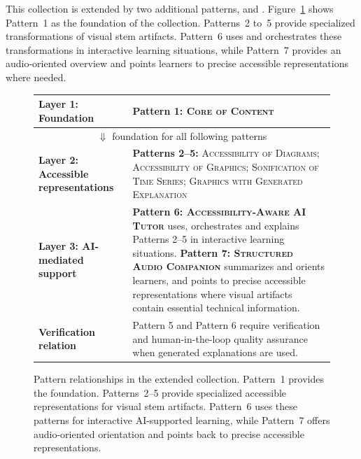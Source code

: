This collection is extended by two additional patterns, \patternSixInline and \patternSevenInline. Figure~\ref{fig:pattern-relationships} shows Pattern~1 as the foundation of the collection. Patterns~2 to~5 provide specialized transformations of visual \ac{stem} artifacts. Pattern~6 uses and orchestrates these transformations in interactive learning situations, while Pattern~7 provides an audio-oriented overview and points learners to precise accessible representations where needed.

\begin{figure}[ht]
\centering
\small
\setlength{\tabcolsep}{4pt}
\renewcommand{\arraystretch}{1.25}
\begin{tabularx}{\textwidth}{|p{}|X|}
\hline
\textbf{Layer 1: Foundation} & \textbf{Pattern 1: \textsc{Core of Content}} \\
\hline
\multicolumn{2}{|c|}{$\Downarrow$ foundation for all following patterns} \\
\hline
\textbf{Layer 2: Accessible representations} & \textbf{Patterns 2--5:} \textsc{Accessibility of Diagrams}; \textsc{Accessibility of Graphics}; \textsc{Sonification of Time Series}; \textsc{Graphics with Generated Explanation} \\
\hline
\textbf{Layer 3: AI-mediated support} & \textbf{Pattern 6: \textsc{Accessibility-Aware AI Tutor}} uses, orchestrates and explains Patterns 2--5 in interactive learning situations. \newline
\textbf{Pattern 7: \textsc{Structured Audio Companion}} summarizes and orients learners, and points to precise accessible representations where visual artifacts contain essential technical information. \\
\hline
\textbf{Verification relation} & Pattern 5 and Pattern 6 require verification and human-in-the-loop quality assurance when generated explanations are used. \\
\hline
\end{tabularx}
\caption{Pattern relationships in the extended collection. Pattern~1 provides the foundation. Patterns~2--5 provide specialized accessible representations for visual \ac{stem} artifacts. Pattern~6 uses these patterns for interactive AI-supported learning, while Pattern~7 offers audio-oriented orientation and points back to precise accessible representations.}
\label{fig:pattern-relationships}
\end{figure}
